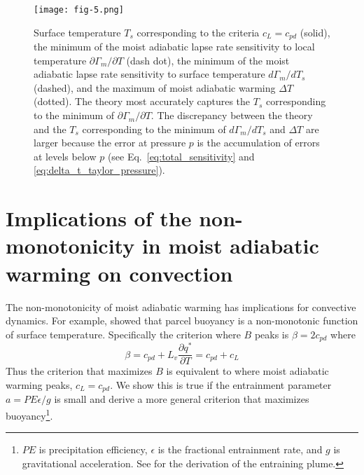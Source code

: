 \documentclass[draft,twocol]{ametsocV6.1}
\begin{document}
\begin{figure}[htbp]
 \centering
 \texttt{[image: fig-5.png]}\\
 \caption{Surface temperature $T_s$ corresponding to the criteria $c_L=c_{pd}$ (solid), the minimum of the moist adiabatic lapse rate sensitivity to local temperature $\partial \Gamma_m/\partial T$ (dash dot), the minimum of the moist adiabatic lapse rate sensitivity to surface temperature $d \Gamma_m/dT_s$ (dashed), and the maximum of moist adiabatic warming $\Delta T$ (dotted). The theory most accurately captures the $T_s$ corresponding to the minimum of $\partial \Gamma_m /\partial T$. The discrepancy between the theory and the $T_s$ corresponding to the minimum of $d\Gamma_m/dT_s$ and $\Delta T$ are larger because the error at pressure $p$ is the accumulation of errors at levels below $p$ (see Eq.~\ref{eq:total_sensitivity} and \ref{eq:delta_t_taylor_pressure}).}\label{fig:fig-5}
\end{figure}

\section{Implications of the non-monotonicity in moist adiabatic warming on convection}
The non-monotonicity of moist adiabatic warming has implications for convective dynamics. For example, \cite{romps2016} showed that parcel buoyancy is a non-monotonic function of surface temperature. Specifically the criterion where $B$ peaks is $\beta = 2c_{pd}$ where
\begin{equation}
\beta = c_{pd} + L_v\frac{\partial q^*}{\partial T} = c_{pd} + c_L
\end{equation}
Thus the \cite{romps2016} criterion that maximizes $B$ is equivalent to where moist adiabatic warming peaks, $c_L = c_{pd}$. We show this is true if the entrainment parameter $a = PE \epsilon / g$ is small and derive a more general criterion that maximizes buoyancy\footnote{$PE$ is precipitation efficiency, $\epsilon$ is the fractional entrainment rate, and $g$ is gravitational acceleration. See \cite{romps2016} for the derivation of the entraining plume.}. 
\end{document}
